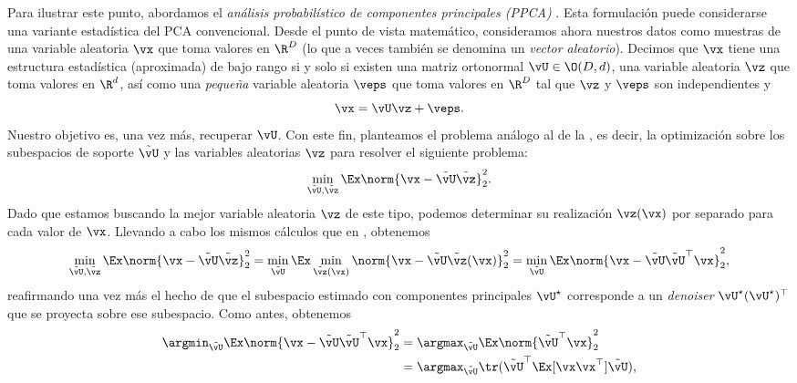 \documentclass[../../book-main.tex]{subfiles}
\begin{document}
Para ilustrar este punto, abordamos el \textit{análisis probabilístico de componentes principales 
(PPCA)} \citep{TippingM1999,DBLP:conf/nips/Roweis97}. Esta formulación puede
considerarse una variante estadística del PCA convencional. Desde el punto de vista matemático,
consideramos ahora nuestros datos como muestras de una variable aleatoria \(\vx\) que toma
valores en \(\R^{D}\) (lo que a veces también se denomina un \textit{vector aleatorio}).
Decimos que \(\vx\) tiene una estructura estadística (aproximada) de bajo rango si y
solo si existen una matriz ortonormal \(\vU \in \O(D, d)\), una
variable aleatoria \(\vz\) que toma valores en \(\R^{d}\), así como una
\textit{pequeña} variable aleatoria \(\veps\) que toma valores en \(\R^{D}\)
tal que \(\vz\) y \(\veps\) son independientes y
\begin{equation}
    \vx = \vU\vz + \veps.
\end{equation}
Nuestro objetivo es, una vez más, recuperar \(\vU\). Con este fin, planteamos el
problema análogo al de la , es decir, la optimización sobre
los subespacios de soporte \(\tilde{\vU}\) y las variables aleatorias \(\vz\) para
resolver el siguiente problema:
\begin{equation}
    \min_{\tilde{\vU}, \tilde{\vz}}\Ex\norm{\vx -
    \tilde{\vU}\tilde{\vz}}_{2}^{2}.
\end{equation}
Dado que estamos buscando la mejor variable aleatoria \(\vz\) de este tipo, podemos
determinar su realización \(\vz(\vx)\) por separado para cada valor de
\(\vx\). Llevando a cabo los mismos cálculos que en , obtenemos %
\begin{equation}\label{eq:ppca_denoising}
    \min_{\tilde{\vU}, \tilde{\vz}}\Ex\norm{\vx -
    \tilde{\vU}\tilde{\vz}}_{2}^{2} =
    \min_{\tilde{\vU}}\Ex\min_{\tilde{\vz}(\vx)}\norm{\vx -
    \tilde{\vU}\tilde{\vz}(\vx)}_{2}^{2} =
    \min_{\tilde{\vU}}\Ex\norm{\vx - \tilde{\vU}\tilde{\vU}^{\top}\vx}_{2}^{2},
\end{equation}
reafirmando una vez más el hecho de que el subespacio estimado con
componentes principales \(\vU^{\star}\) corresponde a un \textit{denoiser}
\(\vU^{\star}(\vU^{\star})^{\top}\) que se proyecta sobre ese
subespacio. Como antes, obtenemos
\begin{align}\label{eq:PPCA}
    \argmin_{\tilde{\vU}}\Ex\norm{\vx -
    \tilde{\vU}\tilde{\vU}^{\top}\vx}_{2}^{2}
    &= \argmax_{\tilde{\vU}}\Ex\norm{\tilde{\vU}^{\top}\vx}_{2}^{2} \\
    &=
    \argmax_{\tilde{\vU}}\tr(\tilde{\vU}^{\top}\Ex[\vx\vx^{\top}]\tilde{\vU}),
\end{align}
\end{document}
